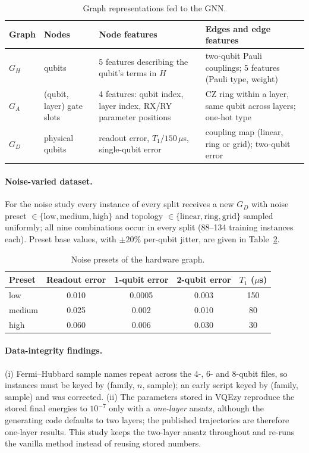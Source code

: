 \documentclass{ssnreview}
\begin{document}
\begin{table}[H]
\centering
\caption{Graph representations fed to the GNN.}\label{tab:graphs}
\small
\begin{tabularx}{\textwidth}{L{1.1cm}L{2.6cm}YY}
\toprule
Graph & Nodes & Node features & Edges and edge features \\
\midrule
$G_H$ & qubits & 5 features describing the qubit's terms in $H$ & two-qubit Pauli couplings; 5 features (Pauli type, weight) \\
$G_A$ & (qubit, layer) gate slots & 4 features: qubit index, layer index, RX/RY parameter positions & CZ ring within a layer, same qubit across layers; one-hot type \\
$G_D$ & physical qubits & readout error, $T_1/150\,\mu$s, single-qubit error & coupling map (linear, ring or grid); two-qubit error \\
\bottomrule
\end{tabularx}
\end{table}

\paragraph{Noise-varied dataset.} For the noise study every instance of every split receives a
new $G_D$ with noise preset $\in\{\text{low},\text{medium},\text{high}\}$ and topology
$\in\{\text{linear},\text{ring},\text{grid}\}$ sampled uniformly; all nine combinations occur in
every split (88--134 training instances each). Preset base values, with $\pm20\%$ per-qubit
jitter, are given in Table~\ref{tab:presets}.

\begin{table}[H]
\centering
\caption{Noise presets of the hardware graph.}\label{tab:presets}
\begin{tabular}{lcccc}
\toprule
Preset & Readout error & 1-qubit error & 2-qubit error & $T_1$ ($\mu$s) \\
\midrule
low    & 0.010 & 0.0005 & 0.003 & 150 \\
medium & 0.025 & 0.002  & 0.010 & 80 \\
high   & 0.060 & 0.006  & 0.030 & 30 \\
\bottomrule
\end{tabular}
\end{table}

\paragraph{Data-integrity findings.} (i) Fermi--Hubbard sample names repeat across the 4-, 6-
and 8-qubit files, so instances must be keyed by (family, $n$, sample); an early script keyed by
(family, sample) and was corrected. (ii) The parameters stored in VQEzy reproduce the stored
final energies to $10^{-7}$ only with a \emph{one-layer} ansatz, although the generating code
defaults to two layers; the published trajectories are therefore one-layer results. This study
keeps the two-layer ansatz throughout and re-runs the vanilla method instead of reusing stored
numbers.
\end{document}
